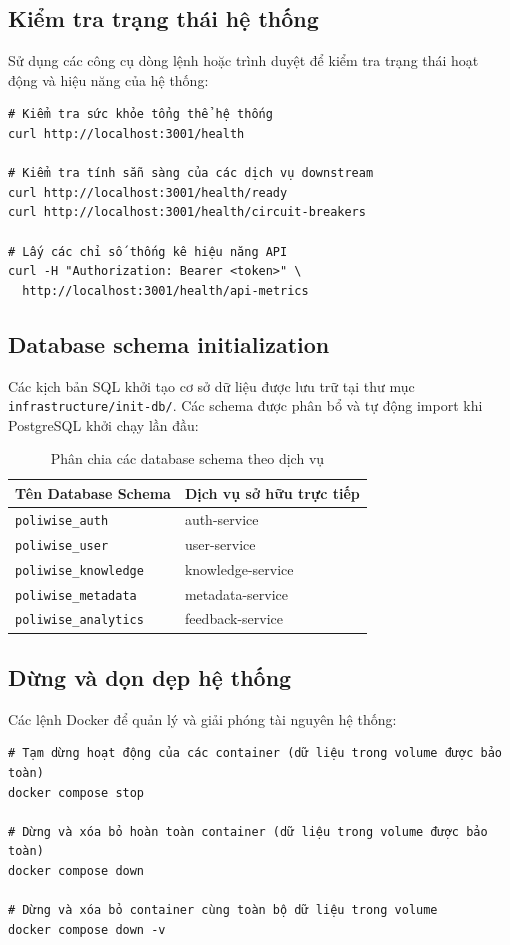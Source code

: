 \documentclass[12pt,a4paper]{report}
\begin{document}
\subsection{Kiểm tra trạng thái hệ thống}
Sử dụng các công cụ dòng lệnh hoặc trình duyệt để kiểm tra trạng thái hoạt động và hiệu năng của hệ thống:
\begin{verbatim}
# Kiểm tra sức khỏe tổng thể hệ thống
curl http://localhost:3001/health

# Kiểm tra tính sẵn sàng của các dịch vụ downstream
curl http://localhost:3001/health/ready
curl http://localhost:3001/health/circuit-breakers

# Lấy các chỉ số thống kê hiệu năng API
curl -H "Authorization: Bearer <token>" \
  http://localhost:3001/health/api-metrics
\end{verbatim}

\subsection{Database schema initialization}
Các kịch bản SQL khởi tạo cơ sở dữ liệu được lưu trữ tại thư mục \texttt{infrastructure/init-db/}. Các schema được phân bổ và tự động import khi PostgreSQL khởi chạy lần đầu:
\begin{table}[H]
\centering
\caption{Phân chia các database schema theo dịch vụ}
\label{tab:db_init_schemas}
\begin{tabularx}{\textwidth}{|l|X|}
\hline
\rowcolor{gray!10}
Tên Database Schema & Dịch vụ sở hữu trực tiếp \\ \hline
\texttt{poliwise\_auth} & auth-service \\ \hline
\texttt{poliwise\_user} & user-service \\ \hline
\texttt{poliwise\_knowledge} & knowledge-service \\ \hline
\texttt{poliwise\_metadata} & metadata-service \\ \hline
\texttt{poliwise\_analytics} & feedback-service \\ \hline
\end{tabularx}
\end{table}

\subsection{Dừng và dọn dẹp hệ thống}
Các lệnh Docker để quản lý và giải phóng tài nguyên hệ thống:
\begin{verbatim}
# Tạm dừng hoạt động của các container (dữ liệu trong volume được bảo toàn)
docker compose stop

# Dừng và xóa bỏ hoàn toàn container (dữ liệu trong volume được bảo toàn)
docker compose down

# Dừng và xóa bỏ container cùng toàn bộ dữ liệu trong volume
docker compose down -v
\end{verbatim}
\end{document}
